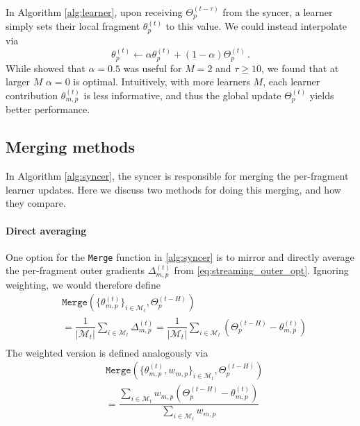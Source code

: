 \documentclass[11pt, a4paper, twocolumn, copyright, google]{google}
\newcommand{\mergefn}{\texttt{Merge}\xspace}
\begin{document}
In Algorithm \ref{alg:learner}, upon receiving $\Theta_p^{(t-\tau)}$ from the syncer, a learner simply sets their local fragment $\theta_p^{(t)}$ to this value. We could instead interpolate via
%
\begin{equation}  
\theta_p^{(t)} \gets \alpha \theta_p^{(t)} + (1-\alpha) \Theta_p^{(t)}\,.
\end{equation}
%
While \citet{douillard2025streaming} showed that $\alpha=0.5$ was useful for $M=2$ and $\tau \ge 10$, we found that at larger $M$ $\alpha=0$ is optimal. Intuitively, with more learners $M$, each learner contribution $\theta_{m, p}^{(t)}$ is less informative, and thus the global update $\Theta_p^{(t)}$ yields better performance.

\subsection{Merging methods}\label{sec:merging_ablations}


In Algorithm \ref{alg:syncer}, the syncer is responsible for merging the per-fragment learner updates. Here we discuss two methods for doing this merging, and how they compare.

\paragraph{Direct averaging} One option for the \mergefn function in \autoref{alg:syncer} is to mirror \citep{douillard2024diloco} and directly average the per-fragment outer gradients $\Delta_{m, p}^{(t)}$ from \eqref{eq:streaming_outer_opt}. Ignoring weighting, we would therefore define
\begin{align*}
& \mergefn\left(\{\theta_{m, p}^{(t)}\}_{i \in \mathcal{M}_t}, \Theta_{p}^{(t-H)}\right) \\
& = \dfrac{1}{|\mathcal{M}_t|} \sum_{i\in\mathcal{M}_t} \Delta_{m, p}^{(t)} = \dfrac{1}{|\mathcal{M}_t|} \sum_{i\in\mathcal{M}_t} \left(\Theta_p^{(t-H)} - \theta_{m, p}^{(t)} \right) \\
\end{align*}
The weighted version is defined analogously via
\begin{align*}
& \mergefn\left(\{\theta_{m, p}^{(t)}, w_{m, p}\}_{i \in \mathcal{M}_t}, \Theta_{p}^{(t-H)}\right) \\
& = \dfrac{\sum_{i\in\mathcal{M}_t} w_{m, p}\left(\Theta_p^{(t-H)} - \theta_{m, p}^{(t)} \right)}{\sum_{i \in \mathcal{M}_t} w_{m, p}} \\
\end{align*}
\end{document}
